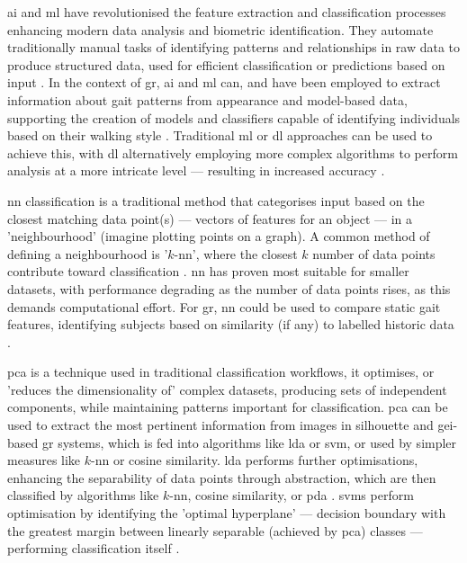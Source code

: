 \ac{ai} and \ac{ml} have revolutionised the feature extraction and classification processes enhancing modern data analysis and biometric identification.
They automate traditionally manual tasks of identifying patterns and relationships in raw data to produce structured data, used for efficient classification or predictions based on input \parencite{bishopPatternRecognitionMachine2006}.
In the context of \ac{gr}, \ac{ai} and \ac{ml} can, and have been employed to extract information about gait patterns from appearance and model-based data, supporting the creation of models and classifiers capable of identifying individuals based on their walking style \parencite{ghilomRoleMachineLearning2024}.
Traditional \ac{ml} or \ac{dl} approaches can be used to achieve this, with \ac{dl} alternatively employing more complex algorithms to perform analysis at a more intricate level --- resulting in increased accuracy \parencite{shenComprehensiveSurveyDeep2023}.

\ac{nn} classification is a traditional method that categorises input based on the closest matching data point(s) --- vectors of features for an object --- in a 'neighbourhood' (imagine plotting points on a graph).
A common method of defining a neighbourhood is '$k$-\ac{nn}', where the closest $k$ number of data points contribute toward classification \parencite{faouziClassicMachineLearning2023}.
\ac{nn} has proven most suitable for smaller datasets, with performance degrading as the number of data points rises, as this demands computational effort.
For \ac{gr}, \ac{nn} could be used to compare static gait features, identifying subjects based on similarity (if any) to labelled historic data \parencite{myeducatorMyEducatorAdvantagesDisadvantages2024}.

\ac{pca} is a technique used in traditional classification workflows, it optimises, or 'reduces the dimensionality of' complex datasets, producing sets of independent components, while maintaining patterns important for classification.
\ac{pca} can be used to extract the most pertinent information from images in silhouette and \ac{gei}-based \ac{gr} systems, which is fed into algorithms like \ac{lda} or \acs{svm}, or used by simpler measures like $k$-\ac{nn} or cosine similarity.
\ac{lda} performs further optimisations, enhancing the separability of data points through abstraction, which are then classified by algorithms like $k$-\ac{nn}, cosine similarity, or \ac{pda} \parencite{hongyeGaitRecognitionBased2015}.
\acp{svm} perform optimisation by identifying the 'optimal hyperplane' --- decision boundary with the greatest margin between linearly separable (achieved by \ac{pca}) classes --- performing classification itself \parencite{kowalczykSVMUnderstandingMath2015}.

